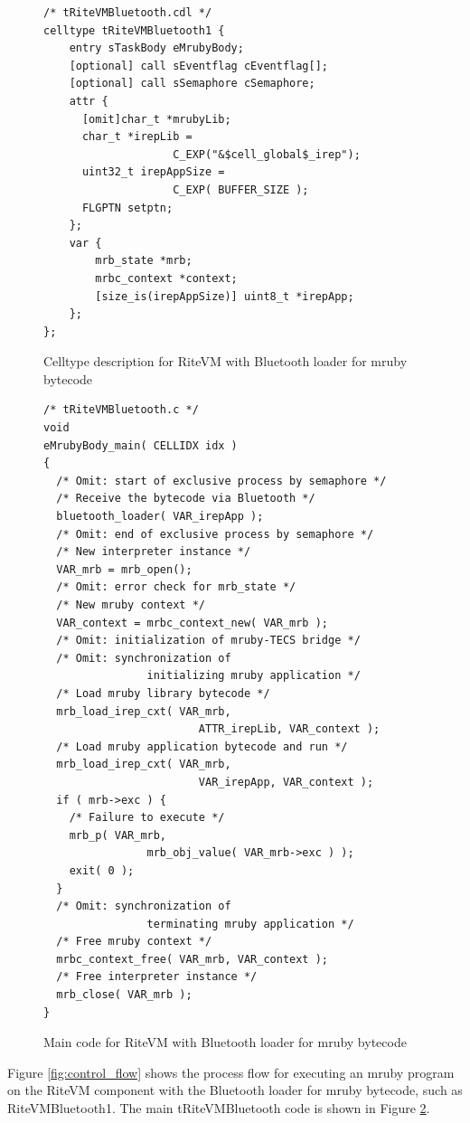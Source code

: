 \documentclass[S,R,E]{article/compsoft}
\begin{document}
\begin{figure}[t]
\centering
\begin{lstlisting}
/* tRiteVMBluetooth.cdl */
celltype tRiteVMBluetooth1 {
    entry sTaskBody eMrubyBody;
    [optional] call sEventflag cEventflag[];
    [optional] call sSemaphore cSemaphore;
    attr {
      [omit]char_t *mrubyLib;
      char_t *irepLib = 
                    C_EXP("&$cell_global$_irep");
      uint32_t irepAppSize = 
                    C_EXP( BUFFER_SIZE );
      FLGPTN setptn;
    };
    var {
        mrb_state *mrb;
        mrbc_context *context;
        [size_is(irepAppSize)] uint8_t *irepApp;
    };
};
\end{lstlisting}
\caption{Celltype description for RiteVM with Bluetooth loader for mruby bytecode}
\label{celltype_mrubybluetooth}
\end{figure}

\begin{figure}[t]
\centering
\begin{lstlisting}
/* tRiteVMBluetooth.c */
void
eMrubyBody_main( CELLIDX idx )
{
  /* Omit: start of exclusive process by semaphore */
  /* Receive the bytecode via Bluetooth */
  bluetooth_loader( VAR_irepApp );
  /* Omit: end of exclusive process by semaphore */
  /* New interpreter instance */
  VAR_mrb = mrb_open();
  /* Omit: error check for mrb_state */
  /* New mruby context */
  VAR_context = mrbc_context_new( VAR_mrb );
  /* Omit: initialization of mruby-TECS bridge */
  /* Omit: synchronization of
                initializing mruby application */
  /* Load mruby library bytecode */
  mrb_load_irep_cxt( VAR_mrb,
                        ATTR_irepLib, VAR_context );
  /* Load mruby application bytecode and run */
  mrb_load_irep_cxt( VAR_mrb,
                        VAR_irepApp, VAR_context );
  if ( mrb->exc ) {
    /* Failure to execute */
    mrb_p( VAR_mrb, 
                mrb_obj_value( VAR_mrb->exc ) );
    exit( 0 );
  }
  /* Omit: synchronization of
                terminating mruby application */
  /* Free mruby context */
  mrbc_context_free( VAR_mrb, VAR_context );
  /* Free interpreter instance */
  mrb_close( VAR_mrb );
}

\end{lstlisting}
\caption{Main code for RiteVM with Bluetooth loader for mruby bytecode}
\label{maincode_mrubybluetooth}
\end{figure}

Figure \ref{fig:control_flow} shows the process flow for executing an mruby program on the RiteVM component with the Bluetooth loader for mruby bytecode, such as RiteVMBluetooth1.
The main tRiteVMBluetooth code is shown in Figure \ref{maincode_mrubybluetooth}.
\end{document}
